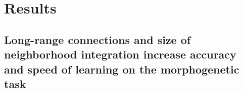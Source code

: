 \documentclass[letterpaper]{article}
\begin{document}



\section{Results}

\subsection{Long-range connections and size of neighborhood integration increase accuracy and speed of learning on the morphogenetic task}

\end{document}
